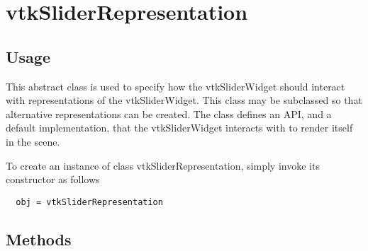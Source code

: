 \section{vtkSliderRepresentation}

\subsection{Usage}

 This abstract class is used to specify how the vtkSliderWidget should
 interact with representations of the vtkSliderWidget. This class may be
 subclassed so that alternative representations can be created. The class
 defines an API, and a default implementation, that the vtkSliderWidget
 interacts with to render itself in the scene.

To create an instance of class vtkSliderRepresentation, simply
invoke its constructor as follows
\begin{verbatim}
  obj = vtkSliderRepresentation
\end{verbatim}
\subsection{Methods}

